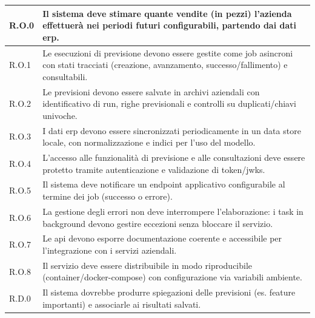 {
\centering
\renewcommand{\arraystretch}{1.2}
\tablelasttail{\hline}

\begin{supertabular}{|p{2.5cm}|p{11.5cm}|}
\hline
R.O.0 & Il sistema deve stimare quante vendite (in pezzi) l’azienda effettuerà nei periodi futuri configurabili, partendo dai dati \gls{erp}. \\ \hline
R.O.1 & Le esecuzioni di previsione devono essere gestite come job asincroni con stati tracciati (creazione, avanzamento, successo/fallimento) e consultabili. \\ \hline
R.O.2 & Le previsioni devono essere salvate in archivi aziendali con identificativo di run, righe previsionali e controlli su duplicati/chiavi univoche. \\ \hline
R.O.3 & I dati \acrshort{erp} devono essere sincronizzati periodicamente in un data store locale, con normalizzazione e indici per l’uso del modello. \\ \hline
R.O.4 & L’accesso alle funzionalità di previsione e alle consultazioni deve essere protetto tramite autenticazione e validazione di token/\gls{jwks}. \\ \hline
R.O.5 & Il sistema deve notificare un endpoint applicativo configurabile al termine dei job (successo o errore). \\ \hline
R.O.6 & La gestione degli errori non deve interrompere l’elaborazione: i task in background devono gestire eccezioni senza bloccare il servizio. \\ \hline
R.O.7 & Le \gls{api} devono esporre documentazione coerente e accessibile per l’integrazione con i servizi aziendali. \\ \hline
R.O.8 & Il servizio deve essere distribuibile in modo riproducibile (container/docker-compose) con configurazione via variabili ambiente. \\ \hline
R.D.0 & Il sistema dovrebbe produrre spiegazioni delle previsioni (es. feature importanti) e associarle ai risultati salvati. \\ \hline

\end{supertabular}}
